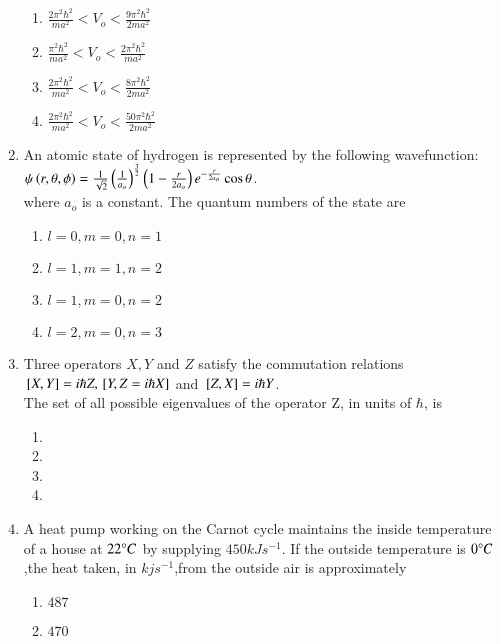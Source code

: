 \documentclass[journal]{IEEEtran}
\begin{document}
\begin{enumerate}
\begin{tikzpicture}
\end{tikzpicture}
\begin{enumerate}
    \item $\frac{2\pi^2\hbar^2}{ma^2}<V_o< \frac{9\pi^2\hbar^2}{2ma^2} $
     \item $\frac{\pi^2\hbar^2}{ma^2}<V_o< \frac{2\pi^2\hbar^2}{ma^2} $
      \item $\frac{2\pi^2\hbar^2}{ma^2}<V_o< \frac{8\pi^2\hbar^2}{2ma^2} $
       \item $\frac{2\pi^2\hbar^2}{ma^2}<V_o< \frac{50\pi^2\hbar^2}{2ma^2} $
\end{enumerate}
\item An atomic state of hydrogen is represented by the following wavefunction: $\psi\brak{r,\theta,\phi}= \frac{1}{\sqrt{2}}\brak{\frac{1}{a_o}}^\frac{3}{2} \brak{1-\frac{r}{2a_o}}e^{-\frac{r}{2a_o}}\cos{\theta}$.\\
where $a_o$ is a constant. The quantum numbers of the state are
\begin{enumerate}
    \item $l=0,m=0,n=1$
    \item $l=1,m=1,n=2$\item $l=1,m=0,n=2$\item $l=2,m=0,n=3$
\end{enumerate}
\item Three operators $X,Y$ and $Z$ satisfy the commutation relations $\sbrak{X,Y}=i\hbar Z,\sbrak{Y,Z=i\hbar X}$ and $\sbrak{Z,X}=i\hbar Y$.\\
The set of all possible eigenvalues of the operator Z, in units of $\hbar$, is
\begin{enumerate}
    \item {}
    \item {}
    \item 
    \item {}
\end{enumerate}
\item A heat pump working on the Carnot cycle maintains the inside temperature of a house at $22\degree C$ by supplying $450 kJs^{-1}$. If the outside temperature is $0\degree C$,the heat taken, in $kjs^{-1}$,from the outside air is approximately
\begin{enumerate}
    \item $487$
    \item $470$

\end{enumerate}
\end{enumerate}
\end{document}
